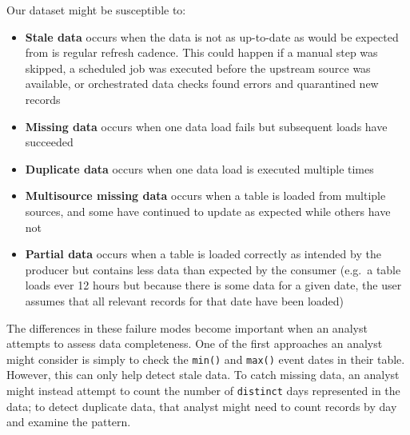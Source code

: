 \documentclass[
]{krantz}
\providecommand{\tightlist}{%
  \setlength{\itemsep}{0pt}\setlength{\parskip}{0pt}}
\begin{document}
Our dataset might be susceptible to:

\begin{itemize}
\tightlist
\item
  \textbf{Stale data} occurs when the data is not as up-to-date as would be expected from is regular refresh cadence. This could happen if a manual step was skipped, a scheduled job was executed before the upstream source was available, or orchestrated data checks found errors and quarantined new records
\item
  \textbf{Missing data} occurs when one data load fails but subsequent loads have succeeded
\item
  \textbf{Duplicate data} occurs when one data load is executed multiple times
\item
  \textbf{Multisource missing data} occurs when a table is loaded from multiple sources, and some have continued to update as expected while others have not
\item
  \textbf{Partial data} occurs when a table is loaded correctly as intended by the producer but contains less data than expected by the consumer (e.g.~a table loads ever 12 hours but because there is some data for a given date, the user assumes that all relevant records for that date have been loaded)
\end{itemize}

The differences in these failure modes become important when an analyst attempts to assess data completeness.
One of the first approaches an analyst might consider is simply to check the \texttt{min()} and \texttt{max()} event dates in their table.
However, this can only help detect stale data.
To catch missing data, an analyst might instead attempt to count the number of \texttt{distinct} days represented in the data; to detect duplicate data, that analyst might need to count records by day and examine the pattern.
\end{document}
